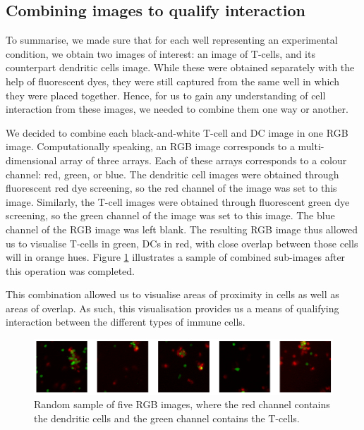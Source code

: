\subsection{Combining images to qualify interaction} \label{subsec:combining}

To summarise, we made sure that for each well representing an experimental condition, we obtain two images of interest: an image of T-cells, and its counterpart dendritic cells image. While these were obtained separately with the help of fluorescent dyes, they were still captured from the same well in which they were placed together. Hence, for us to gain any understanding of cell interaction from these images, we needed to combine them one way or another.

We decided to combine each black-and-white T-cell and DC image in one RGB image. Computationally speaking, an RGB image corresponds to a multi-dimensional array of three arrays. Each of these arrays corresponds to a colour channel: red, green, or blue. The dendritic cell images were obtained through fluorescent red dye screening, so the red channel of the image was set to this image. Similarly, the T-cell images were obtained through fluorescent green dye screening, so the green channel of the image was set to this image. The blue channel of the RGB image was left blank. The resulting RGB image thus allowed us to visualise T-cells in green, DCs in red, with close overlap between those cells will in orange hues. Figure \ref{fig:combined} illustrates a sample of combined sub-images after this operation was completed.

This combination allowed us to visualise areas of proximity in cells as well as areas of overlap. As such, this visualisation provides us a means of qualifying interaction between the different types of immune cells.

\begin{figure}[h]
    \centering
    \includegraphics[width=\textwidth]{dissertation/figures/combined_cells.png}
    \caption{Random sample of five RGB images, where the red channel contains the dendritic cells and the green channel contains the T-cells.}
    \label{fig:combined}
\end{figure}


